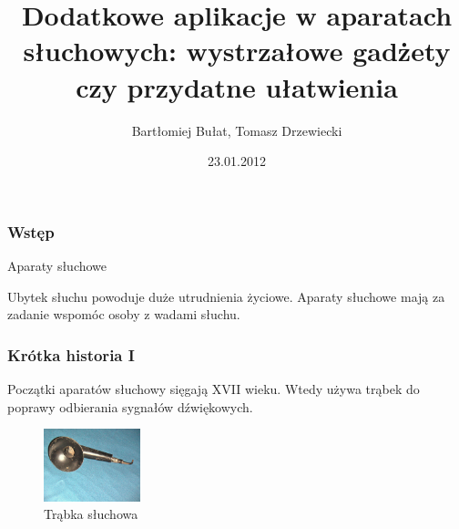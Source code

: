 \documentclass{beamer}
\title[Dodatkowe aplikacje w aparatach słuchowych]{Dodatkowe aplikacje w aparatach\\słuchowych: wystrzałowe gadżety\\czy przydatne ułatwienia}
\author[B. Bułat, T. Drzewiecki]{Bartłomiej Bułat, Tomasz Drzewiecki}
\date[2011]{23.01.2012}
\institute[AGH]
{Wydział EAIiIB\\ 
Katedra Automatyki i Inżynierii Biomedycznej
}
\begin{document}
{
 \begin{frame}
   \titlepage
 \end{frame}
}



\begin{frame}
\frametitle{Wstęp}

\begin{block}{Aparaty słuchowe}

Ubytek słuchu powoduje duże utrudnienia życiowe. Aparaty słuchowe mają za zadanie wspomóc osoby z wadami słuchu.

\end{block}
\end{frame}

\begin{frame}
\frametitle{Krótka historia I}
Początki aparatów słuchowy sięgają XVII wieku. Wtedy używa trąbek do poprawy odbierania sygnałów dźwiękowych.
\begin{figure}
    \includegraphics[width=0.25\textwidth]{trumpet}
    \caption{Trąbka słuchowa}
    \label{fig:trumpet}
\end{figure}
\end{frame}
\end{document}
